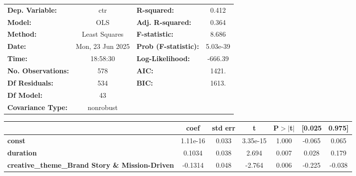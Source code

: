 \begin{center}
\begin{tabular}{lclc}
\toprule
\textbf{Dep. Variable:}                                         &       ctr        & \textbf{  R-squared:         } &     0.412   \\
\textbf{Model:}                                                 &       OLS        & \textbf{  Adj. R-squared:    } &     0.364   \\
\textbf{Method:}                                                &  Least Squares   & \textbf{  F-statistic:       } &     8.686   \\
\textbf{Date:}                                                  & Mon, 23 Jun 2025 & \textbf{  Prob (F-statistic):} &  5.03e-39   \\
\textbf{Time:}                                                  &     18:58:30     & \textbf{  Log-Likelihood:    } &   -666.39   \\
\textbf{No. Observations:}                                      &         578      & \textbf{  AIC:               } &     1421.   \\
\textbf{Df Residuals:}                                          &         534      & \textbf{  BIC:               } &     1613.   \\
\textbf{Df Model:}                                              &          43      & \textbf{                     } &             \\
\textbf{Covariance Type:}                                       &    nonrobust     & \textbf{                     } &             \\
\bottomrule
\end{tabular}
\begin{tabular}{lcccccc}
                                                                & \textbf{coef} & \textbf{std err} & \textbf{t} & \textbf{P$> |$t$|$} & \textbf{[0.025} & \textbf{0.975]}  \\
\midrule
\textbf{const}                                                  &     1.11e-16  &        0.033     &  3.35e-15  &         1.000        &       -0.065    &        0.065     \\
\textbf{duration}                                               &       0.1034  &        0.038     &     2.694  &         0.007        &        0.028    &        0.179     \\
\textbf{creative\_theme\_Brand Story \& Mission-Driven}         &      -0.1314  &        0.048     &    -2.764  &         0.006        &       -0.225    &       -0.038     \\

\end{tabular}
\end{center}
